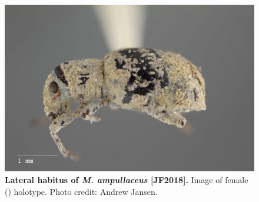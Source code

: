 \documentclass[fleqn,10pt,lineno]{wlpeerj} %
\begin{document}
\begin{figure}[h]
	\begin{sideways}
		\centering
		\includegraphics[height=\textwidth]{figure9.jpg}
	\end{sideways}
	\caption{\textbf{Lateral habitus of \textit{M. ampullaceus} [JF2018].} Image of female (\female) holotype. Photo credit: Andrew Jansen.}
	\label{fig:ampullaceus_F_lateral}
\end{figure}
\end{document}
